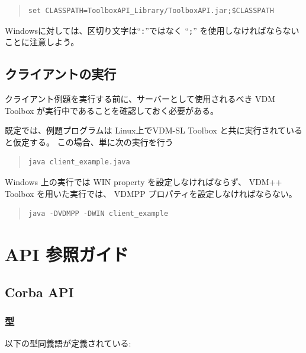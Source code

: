 \documentclass[\pformat,12pt]{jarticle}
\begin{document}
\begin{quote}
\begin{verbatim}
set CLASSPATH=ToolboxAPI_Library/ToolboxAPI.jar;$CLASSPATH
\end{verbatim}  %
\end{quote}

Windowsに対しては、区切り文字は``{\tt :}''ではなく ``{\tt ;}'' を使用しなければならないことに注意しよう。

\subsection{クライアントの実行}

クライアント例題を実行する前に、サーバーとして使用されるべき VDM Toolbox が実行中であることを確認しておく必要がある。

既定では、例題プログラムは Linux上でVDM-SL Toolbox と共に実行されていると仮定する。
この場合、単に次の実行を行う

\begin{quote}
\begin{verbatim}
java client_example.java
\end{verbatim}  
\end{quote}

Windows 上の実行では WIN property を設定しなければならず、 VDM++ Toolbox を用いた実行では、 VDMPP プロパティを設定しなければならない。

\begin{quote}
\begin{verbatim}
java -DVDMPP -DWIN client_example
\end{verbatim}  
\end{quote}

\newpage




\section{API 参照ガイド}\label{refguide}

\subsection{Corba API}\label{ref:corbaapi}


\subsubsection{型}\label{ref:corbatypes}

以下の型同義語が定義されている:
\end{document}
